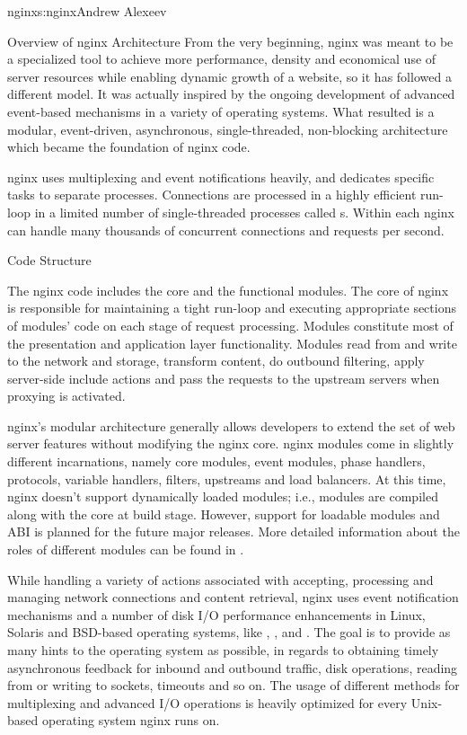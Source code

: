 \begin{aosachapter}{nginx}{s:nginx}{Andrew Alexeev}
\begin{aosasect1}{Overview of nginx Architecture}
From the very beginning, nginx was meant to be a specialized tool to
achieve more performance, density and economical use of server
resources while enabling dynamic growth of a website, so it has
followed a different model. It was actually inspired by the ongoing
development of advanced event-based mechanisms in a variety of
operating systems. What resulted is a modular, event-driven,
asynchronous, single-threaded, non-blocking architecture which became
the foundation of nginx code.

nginx uses multiplexing and event notifications heavily, and dedicates
specific tasks to separate processes. Connections are processed in a
highly efficient run-loop in a limited number of single-threaded
processes called s. Within each  nginx can
handle many thousands of concurrent connections and requests per
second.

\begin{aosasect2}{Code Structure}

The nginx  code includes the core and the functional
modules. The core of nginx is responsible for maintaining a tight
run-loop and executing appropriate sections of modules' code on each
stage of request processing. Modules constitute most of the
presentation and application layer functionality. Modules read from
and write to the network and storage, transform content, do outbound
filtering, apply server-side include actions and pass the requests to
the upstream servers when proxying is activated.

nginx's modular architecture generally allows developers to extend the
set of web server features without modifying the nginx core. nginx
modules come in slightly different incarnations, namely core modules,
event modules, phase handlers, protocols, variable handlers, filters,
upstreams and load balancers. At this time, nginx doesn't support
dynamically loaded modules; i.e., modules are compiled along with the
core at build stage. However, support for loadable modules and ABI is
planned for the future major releases. More detailed information about
the roles of different modules can be found in 
.

While handling a variety of actions associated with accepting,
processing and managing network connections and content retrieval,
nginx uses event notification mechanisms and a number of disk I/O
performance enhancements in Linux, Solaris and BSD-based operating
systems, like , , and . The
goal is to provide as many hints to the operating system as possible,
in regards to obtaining timely asynchronous feedback for inbound and
outbound traffic, disk operations, reading from or writing to sockets,
timeouts and so on. The usage of different methods for multiplexing
and advanced I/O operations is heavily optimized for every Unix-based
operating system nginx runs on.


\end{aosasect2}
\end{aosasect1}
\end{aosachapter}
